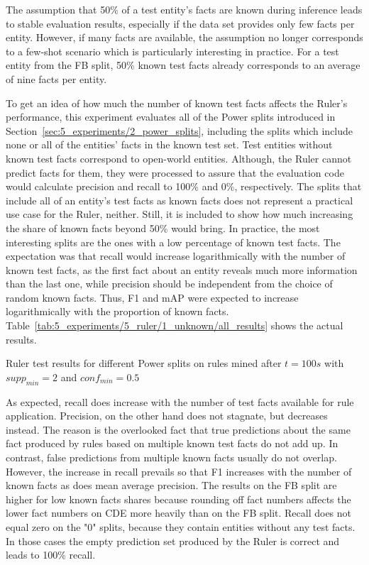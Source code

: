 The assumption that 50\% of a test entity's facts are known during inference leads to stable evaluation results, especially if the data set provides only few facts per entity. However, if many facts are available, the assumption no longer corresponds to a few-shot scenario which is particularly interesting in practice. For a test entity from the FB split, 50\% known test facts already corresponds to an average of nine facts per entity.

To get an idea of how much the number of known test facts affects the Ruler's performance, this experiment evaluates all of the Power splits introduced in Section~\ref{sec:5_experiments/2_power_splits}, including the splits which include none or all of the entities' facts in the known test set. Test entities without known test facts correspond to open-world entities. Although, the Ruler cannot predict facts for them, they were processed to assure that the evaluation code would calculate precision and recall to 100\% and 0\%, respectively. The splits that include all of an entity's test facts as known facts does not represent a practical use case for the Ruler, neither. Still, it is included to show how much increasing the share of known facts beyond 50\% would bring. In practice, the most interesting splits are the ones with a low percentage of known test facts. The expectation was that recall would increase logarithmically with the number of known test facts, as the first fact about an entity reveals much more information than the last one, while precision should be independent from the choice of random known facts. Thus, F1 and mAP were expected to increase logarithmically with the proportion of known facts. Table~\ref{tab:5_experiments/5_ruler/1_unknown/all_results} shows the actual results.

\begin{table}
    \centering
    
    \caption{Ruler test results for different Power splits on rules mined after $t = 100s$ with $supp_{min} = 2$ and $conf_{min} = 0.5$}
    \label{tab:5_experiments/5_ruler/1_unknown/all_results}
\end{table}

As expected, recall does increase with the number of test facts available for rule application. Precision, on the other hand does not stagnate, but decreases instead. The reason is the overlooked fact that true predictions about the same fact produced by rules based on multiple known test facts do not add up. In contrast, false predictions from multiple known facts usually do not overlap. However, the increase in recall prevails so that F1 increases with the number of known facts as does mean average precision. The results on the FB split are higher for low known facts shares because rounding off fact numbers affects the lower fact numbers on CDE more heavily than on the FB split. Recall does not equal zero on the "0" splits, because they contain entities without any test facts. In those cases the empty prediction set produced by the Ruler is correct and leads to 100\% recall.
